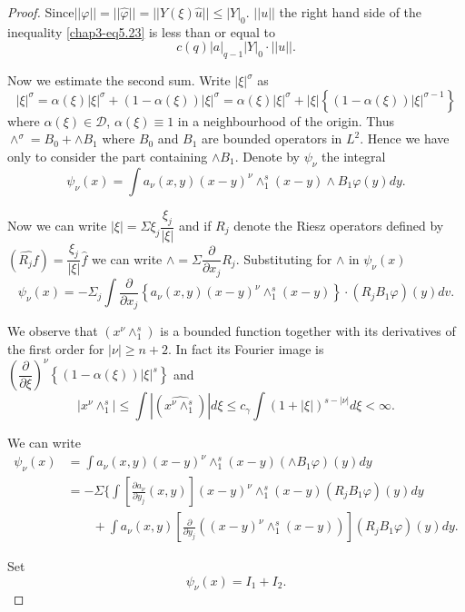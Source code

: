 \begin{proof}
Since\pageoriginale $|| \varphi || = || \hat{\varphi}|| = || Y(\xi)
\hat{u}|| \leq |Y|_0$. $||u||$ the right hand side of the inequality
\eqref{chap3-eq5.23} is less than or equal to  
$$
c(q) |a|_{q-1} | Y|_0 \cdot||u||. 
$$

Now we estimate the second sum. Write $|\xi|^\sigma$ as 
$$
|\xi|^\sigma = \alpha (\xi) |\xi|^\sigma + (1- \alpha (\xi))
|\xi|^\sigma = \alpha (\xi) |\xi|^\sigma + |\xi| \left\{ (1- \alpha
(\xi)) |\xi|^{\sigma-1} \right\} 
$$
where $\alpha (\xi) \in \mathscr{D}$, $\alpha (\xi) \equiv 1$
in a neighbourhood of the origin. Thus $\wedge^\sigma = B_0 + \wedge
B_1$ where $B_0$ and $B_1$ are bounded operators in $L^2$. Hence we
have only to consider the part containing $\wedge B_1$. Denote by
$\psi_\nu$ the integral 
$$
\psi_\nu (x)= \int a_\nu (x, y) (x-y)^\nu \wedge^s_1 (x-y) \wedge B_1
\varphi (y)dy.  
$$

Now we can write $|\xi|= \Sigma \xi_j \dfrac{\xi_j}{|\xi|}$ and if
$R_j$ denote the Riesz operators defined by $(\widehat{R_j f}) =
\dfrac{\xi_j}{|\xi|} \hat{f}$ we can write $\wedge= \Sigma
\dfrac{\partial}{\partial x_j} R_j$. Substituting for $\wedge $ in
$\psi_\nu (x)$ 
$$
\psi_\nu (x)= - \Sigma_j \int \frac{\partial}{\partial x_j} \left\{
a_\nu (x, y) (x-y)^\nu \wedge^s_1 (x-y ) \right\} \cdot (R_j  B_1 \varphi)
(y)dv. 
$$


We observe that $(x^\nu \wedge^s_1)$ is a bounded function together with
its deri\-vatives of the first order for $|\nu| \geq n+2$. In fact its
Fourier image is $\left(\dfrac{\partial}{\partial \xi}\right)^\nu
\left\{ (1- \alpha (\xi)) |\xi|^s \right\}$ and  
$$
|x^\nu \wedge^s_1 | \leq \int |(\widehat{x^\nu \wedge^s_1})| d \xi 
\leq c_\gamma \int (1 + |\xi|)^{s-|\nu|} d \xi < \infty. 
$$

We can write 
\begin{align*}
\psi_\nu (x) & = \int a_\nu (x,y ) (x-y )^\nu  \wedge^s_1 (x-y)
(\wedge B_1 \varphi ) (y) dy\\ 
& = -\Sigma \Big\{ \int \left[\frac{\partial a_\nu}{\partial y_j} (x,
  y) \right]
(x-y)^\nu \wedge^s_1 (x-y) (R_j B_1 \varphi ) (y) dy\\
& \qquad  + \int a_\nu (x,y) \left[\frac{\partial }{ \partial y_j
  }((x-y)^\nu \wedge_1^s (x-y)) \right] (R_j B_1 \varphi ) (y ) dy.  
\end{align*}\pageoriginale

Set 
\begin{equation}
\psi_\nu (x)= I_1 + I_2. \tag{5.24}\label{chap3-eq5.24}
\end{equation}


\end{proof}
